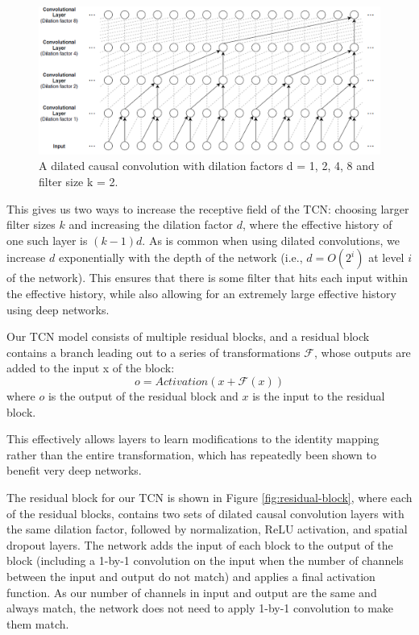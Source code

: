 \documentclass[12pt,a4paper,titlepage,openany]{report}
\begin{document}
\begin{figure}
    \centering
    \includegraphics[width=1\linewidth]{images/Chapter3_Methodology/dilation factor.png}
    \caption{A dilated causal convolution with dilation factors d = 1, 2, 4, 8 and filter size k = 2.}
    \label{fig:dilation-factor}
\end{figure}

This gives us two ways to increase the receptive field of the TCN: choosing larger filter sizes \(k\) and increasing the dilation factor \(d\), where the effective history of one such layer is \((k - 1)d\). As is common when using dilated convolutions, we increase \(d\) exponentially with the depth of the network (i.e., \(d = O(2^i)\) at level \(i\) of the network). This ensures that there is some filter that hits each input within the effective history, while also allowing for an extremely large effective history using deep networks.

Our TCN model consists of multiple residual blocks, and a residual block contains a branch leading out to a series of transformations \(\mathcal{F}\), whose outputs are added to the input x of the block:
\begin{equation}
    o = Activation(x + \mathcal{F}(x))
    \label{eq:activation}
\end{equation}
where \(o\) is the output of the residual block and \(x\) is the input to the residual block.

This effectively allows layers to learn modifications to the identity mapping rather than the entire transformation, which has repeatedly been shown to benefit very deep networks.

The residual block for our TCN is shown in Figure \ref{fig:residual-block}, where each of the residual blocks, contains two sets of dilated causal convolution layers with the same dilation factor, followed by normalization, ReLU activation, and spatial dropout layers. The network adds the input of each block to the output of the block (including a 1-by-1 convolution on the input when the number of channels between the input and output do not match) and applies a final activation function. As our number of channels in input and output are the same and always match, the network does not need to apply 1-by-1 convolution to make them match.
\end{document}

